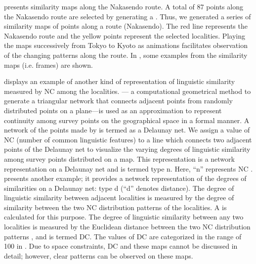 \documentclass[output=paper]{LSP/langsci}
\begin{document}
 presents similarity maps along the Nakasendo route. A total of 87 points along the Nakasendo route are selected by generating a . Thus, we generated a series of similarity maps of points along a route (Nakasendo). The red line represents the Nakasendo route and the yellow points represent the selected localities. Playing the maps successively from Tokyo to Kyoto as animations facilitates observation of the changing patterns along the route. In , some examples from the similarity maps (i.e. frames) are shown.

 displays an example of another kind of representation of linguistic similarity measured by NC among the localities.  — a computational geometrical method to generate a triangular network that connects adjacent points from randomly distributed points on a plane—is used as an approximation to represent continuity among survey points on the geographical space in a formal manner. A network of the points made by  is termed as a Delaunay net. We assign a value of NC (number of common linguistic features) to a line which connects two adjacent points of the Delaunay net to visualize the varying degrees of linguistic similarity among survey points distributed on a map. This representation is a network representation on a Delaunay net and is termed type n. Here, “n” represents NC \citep[2, 4]{kumagai_development_2013}.  presents another example; it provides a network representation of the degrees of similarities on a Delaunay net: type d (“d” denotes distance). The degree of linguistic similarity between adjacent localities is measured by the degree of similarity between the two NC distribution patterns of the localities. A  is calculated for this purpose. The degree of linguistic similarity between any two localities is measured by the Euclidean distance between the two NC distribution patterns \citep[2, 4]{kumagai_development_2013}, and is termed DC. The values of DC are categorized in the range of 100 in . Due to space constraints, DC and these maps cannot be discussed in detail; however, clear patterns can be observed on these maps.
\end{document}
